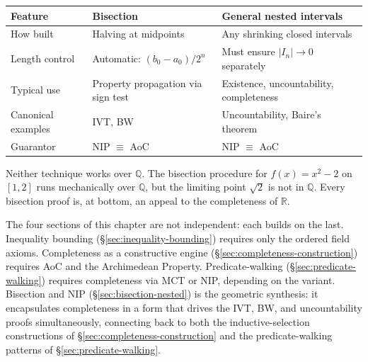 \begin{remark}
\medskip
\begin{tabular}{@{}lll@{}}
\toprule
\textbf{Feature} & \textbf{Bisection} & \textbf{General nested intervals} \\
\midrule
How built & Halving at midpoints & Any shrinking closed intervals \\
Length control & Automatic: $(b_0-a_0)/2^n$ & Must ensure $|I_n|\to 0$ separately \\
Typical use & Property propagation via sign test & Existence, uncountability, completeness \\
Canonical examples & IVT, BW & Uncountability, Baire's theorem \\
Guarantor & NIP $\equiv$ AoC & NIP $\equiv$ AoC \\
\bottomrule
\end{tabular}
\end{remark}

\begin{remark}
Neither technique works over $\mathbb{Q}$. The bisection procedure for
$f(x)=x^2-2$ on $[1,2]$ runs mechanically over $\mathbb{Q}$, but the
limiting point $\sqrt{2}$ is not in $\mathbb{Q}$. Every bisection proof
is, at bottom, an appeal to the completeness of $\mathbb{R}$.
\end{remark}

\begin{remark}
The four sections of this chapter are not independent: each builds on the
last. Inequality bounding (\S\ref{sec:inequality-bounding}) requires only
the ordered field axioms. Completeness as a constructive engine
(\S\ref{sec:completeness-construction}) requires AoC and the Archimedean
Property. Predicate-walking (\S\ref{sec:predicate-walking}) requires
completeness via MCT or NIP, depending on the variant. Bisection and NIP
(\S\ref{sec:bisection-nested}) is the geometric synthesis: it encapsulates
completeness in a form that drives the IVT, BW, and uncountability proofs
simultaneously, connecting back to both the inductive-selection constructions
of \S\ref{sec:completeness-construction} and the predicate-walking patterns
of \S\ref{sec:predicate-walking}.
\end{remark}
